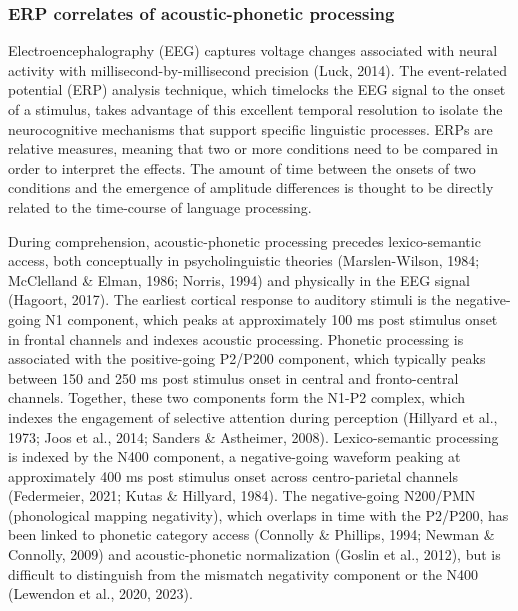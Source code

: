 \documentclass[
  12pt,
  twoside]{article}
\begin{document}
\hypertarget{erp-correlates-of-acoustic-phonetic-processing}{%
\subsubsection{ERP correlates of acoustic-phonetic processing}\label{erp-correlates-of-acoustic-phonetic-processing}}

Electroencephalography (EEG) captures voltage changes associated with neural activity with millisecond-by-millisecond precision (Luck, 2014).
The event-related potential (ERP) analysis technique, which timelocks the EEG signal to the onset of a stimulus, takes advantage of this excellent temporal resolution to isolate the neurocognitive mechanisms that support specific linguistic processes.
ERPs are relative measures, meaning that two or more conditions need to be compared in order to interpret the effects.
The amount of time between the onsets of two conditions and the emergence of amplitude differences is thought to be directly related to the time-course of language processing.

During comprehension, acoustic-phonetic processing precedes lexico-semantic access, both conceptually in psycholinguistic theories (Marslen-Wilson, 1984; McClelland \& Elman, 1986; Norris, 1994) and physically in the EEG signal (Hagoort, 2017).
The earliest cortical response to auditory stimuli is the negative-going N1 component, which peaks at approximately 100 ms post stimulus onset in frontal channels and indexes acoustic processing.
Phonetic processing is associated with the positive-going P2/P200 component, which typically peaks between 150 and 250 ms post stimulus onset in central and fronto-central channels.
Together, these two components form the N1-P2 complex, which indexes the engagement of selective attention during perception (Hillyard et al., 1973; Joos et al., 2014; Sanders \& Astheimer, 2008).
Lexico-semantic processing is indexed by the N400 component, a negative-going waveform peaking at approximately 400 ms post stimulus onset across centro-parietal channels (Federmeier, 2021; Kutas \& Hillyard, 1984).
The negative-going N200/PMN (phonological mapping negativity), which overlaps in time with the P2/P200, has been linked to phonetic category access (Connolly \& Phillips, 1994; Newman \& Connolly, 2009) and acoustic-phonetic normalization (Goslin et al., 2012), but is difficult to distinguish from the mismatch negativity component or the N400 (Lewendon et al., 2020, 2023).
\end{document}
